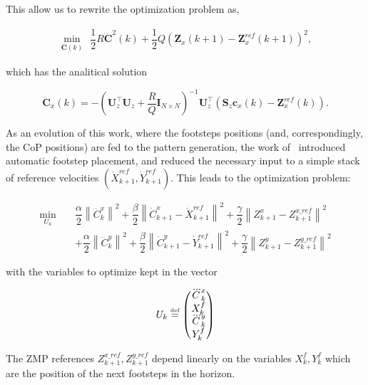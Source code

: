 This allow us to rewrite the optimization problem as,

\begin{eqnarray}
\nonumber
\underset{\dddot{\mathbf{C}}(k)}{\min} ~~ \dfrac{1}{2} R \dddot{\mathbf{C}}^2(k) + \dfrac{1}{2} Q (\mathbf{Z}_x(k+1) - \mathbf{Z}^{ref}_x(k+1))^2,
\label{Eq:MinJerk}
\end{eqnarray}
 
which has the analitical solution

\begin{equation}
\dddot{\mathbf{C}}_x(k) = -(\mathbf{U}_z^{\top} \mathbf{U}_z + \dfrac{R}{Q} \mathbf{I}_{N \times N})^{-1} \mathbf{U}_z^{\top}(\mathbf{S}_z \mathbf{c}_x(k) - \mathbf{Z}_x^{ref}(k)).
\end{equation}

As an evolution of this work, where the footsteps positions (and, correspondingly, the CoP positions) are fed to the pattern generation, the work of~\citep{HerdtAR2010} introduced automatic footstep placement, and reduced the necessary input to a simple stack of reference velocities $(\dot{X}_{k+1}^{ref},\dot{Y}_{k+1}^{ref})$. This leads to the optimization problem:

\begin{eqnarray}
\nonumber
 \underset{U_{k}}{\min} \; && \dfrac{\alpha}{2} \left\| \dddot{C}_k^{x} \right\|^2 + \dfrac{\beta}{2} \left\| \dot{C}_{k+1}^{x} - \dot{X}_{k+1}^{ref} \right\|^2
 + \dfrac{\gamma}{2} \left\| Z_{k+1}^x - Z_{k+1}^{x\_{ref}} \right\|^2 \\
 && + \dfrac{\alpha}{2} \left\| \dddot{C}_k^{y} \right\|^2 + \dfrac{\beta}{2} \left\| \dot{C}_{k+1}^{y} - \dot{Y}_{k+1}^{ref} \right\|^2
 + \dfrac{\gamma}{2} \left\| Z_{k+1}^y - Z_{k+1}^{y\_{ref}} \right\|^2
\label{Eq:MinJerk}
\end{eqnarray}

with the variables to optimize kept in the vector 

$$
U_{k} \stackrel{\mbox{\tiny def}}{=} 
\left(
\begin{matrix}
\dddot{C}_k^{x} \\
X_{k}^{f} \\
\dddot{C}_k^{y} \\
Y_{k}^{f}
\end{matrix}
\right)
$$

The ZMP references $Z_{k+1}^{x\_{ref}},Z_{k+1}^{y\_{ref}}$ depend linearly on the variables $X_{k}^{f},Y_{k}^{f}$ which are the position of the next footsteps in the horizon.

